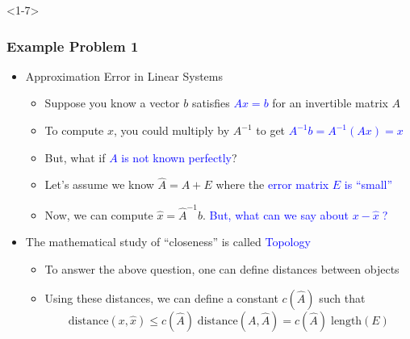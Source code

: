 \documentclass[10pt,english,aspectratio=169]{beamer}
\newcommand{\vecnot}[1]{#1}
\begin{document}
\begin{frame}<1-7> \frametitle{Example Problem 1}

\begin{itemize}
\item<1-> Approximation Error in Linear Systems \vspace{1mm}

\begin{itemize}
  \setlength\itemsep{3mm}
  \item<1-> Suppose you know a vector $\vecnot{b}$ satisfies \textcolor{blue}{$A \vecnot{x} = \vecnot{b}$} for an invertible matrix $A$
  
  \item<2-> To compute $\vecnot{x}$, you could multiply by $A^{-1}$ to get \textcolor{blue}{$A^{-1} \vecnot{b} = A^{-1} (A \vecnot{x}) = \vecnot{x}\!\!\!\!\!\!\!\!\!$}
  
  \item<3-> But, what if \textcolor{blue}{$A$ is not known perfectly}?
  
  \item<4-> Let's assume we know $\hat{A} = A + E$ where the \textcolor{blue}{error matrix $E$ is ``small''}
  
  \item<5-> Now, we can compute $\hat{\vecnot{x}} = \hat{A}^{-1} \vecnot{b}$. \textcolor{blue}{But, what can we say about $\vecnot{x}-\hat{\vecnot{x}}\;$?} \vspace{3mm}

\end{itemize}

\item <6-> The mathematical study of ``closeness'' is called \textcolor{blue}{Topology} \vspace{1mm}

\begin{itemize}
  \setlength\itemsep{3mm}
  \item<6-> To answer the above question, one can define distances between objects
  \item<7-> Using these distances, we can define a constant $c(\hat{A})$ such that
  \[ \text{distance}(\vecnot{x},\hat{\vecnot{x}}) \leq c(\hat{A}) \; \text{distance}(A,\hat{A}) = c(\hat{A}) \; \text{length}(E)  \]
\end{itemize}
  
\end{itemize}


\end{frame}
\end{document}

